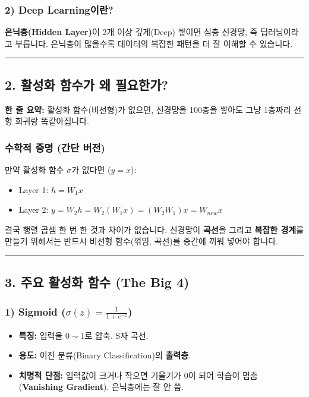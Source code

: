 \documentclass[11pt,a4paper]{book}
\theoremstyle{definition}
\begin{document}
\subsubsection*{2) Deep Learning이란?}
\textbf{은닉층(Hidden Layer)}이 2개 이상 깊게(Deep) 쌓이면 심층 신경망, 즉 딥러닝이라고 부릅니다. 은닉층이 많을수록 데이터의 복잡한 패턴을 더 잘 이해할 수 있습니다.

\vspace{0.5cm}\hrule\vspace{0.5cm}

\subsection{2. 활성화 함수가 왜 필요한가?}

\begin{conceptbox}[title={개념 2: 선형 + 선형 = 선형}]
\textbf{한 줄 요약:} 활성화 함수(비선형)가 없으면, 신경망을 100층을 쌓아도 그냥 1층짜리 선형 회귀랑 똑같아집니다.
\end{conceptbox}

\subsubsection*{수학적 증명 (간단 버전)}
만약 활성화 함수 $\sigma$가 없다면 ($y = x$):
\begin{itemize}
    \item Layer 1: $h = W_1 x$
    \item Layer 2: $y = W_2 h = W_2 (W_1 x) = (W_2 W_1) x = W_{new} x$
\end{itemize}
결국 행렬 곱셈 한 번 한 것과 차이가 없습니다. 신경망이 \textbf{곡선}을 그리고 \textbf{복잡한 경계}를 만들기 위해서는 반드시 비선형 함수(꺾임, 곡선)를 중간에 끼워 넣어야 합니다.

\vspace{0.5cm}\hrule\vspace{0.5cm}

\subsection{3. 주요 활성화 함수 (The Big 4)}


\subsubsection*{1) Sigmoid ($\sigma(z) = \frac{1}{1+e^{-z}}$)}
\begin{itemize}
    \item \textbf{특징:} 입력을 $0 \sim 1$로 압축. S자 곡선.
    \item \textbf{용도:} 이진 분류(Binary Classification)의 \textbf{출력층}.
    \item \textbf{치명적 단점:} 입력값이 크거나 작으면 기울기가 0이 되어 학습이 멈춤 (\textbf{Vanishing Gradient}). 은닉층에는 잘 안 씀.
\end{itemize}
\end{document}
